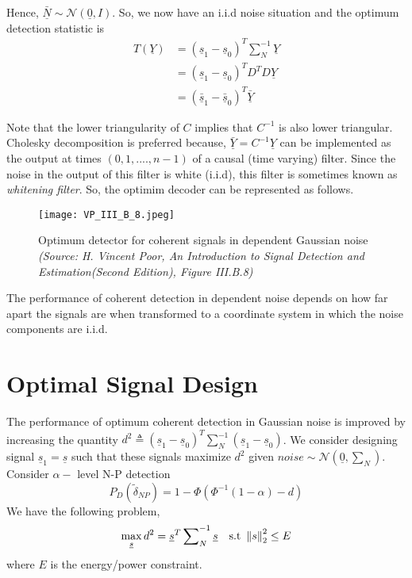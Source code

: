 \documentclass[a4paper,english,12pt]{article}
\begin{document}
\noindent Hence, $\underline{\bar{N}} \sim \mathcal{N}(\underline{0},I)$. So, we now have an i.i.d noise situation and the optimum detection statistic is 
\begin{align*}
T(\underline{Y}) &=(\underline{s}_1 - \underline{s}_0)^T\sum\nolimits_N^{-1}\underline{Y} \\
&=(\underline{s}_1 - \underline{s}_0)^T D^T D \underline{Y} \\
&=(\underline{\bar{s}}_1 - \underline{\bar{s}}_0)^T \underline{\bar{Y}}
\end{align*}

\noindent Note that the lower triangularity of $C$ implies that $C^{-1}$ is also lower triangular.\\
Cholesky decomposition is preferred because, $\underline{\bar{Y}}=C^{-1}\underline{Y}$ can be implemented as the output at times $(0,1,....,n-1)$ of a causal (time varying) filter. Since the noise in the output of this filter is white (i.i.d), this filter is sometimes known as \textit{whitening filter}. So, the optimim decoder can be represented as follows.  

\begin{figure}[hbtp]
\centering
\texttt{[image: VP\_III\_B\_8.jpeg]}
\caption{Optimum detector for coherent signals in dependent Gaussian noise \\ \textit{(Source: H. Vincent Poor, An Introduction to Signal Detection and Estimation(Second
Edition), Figure III.B.8)}}
\label{vp_III_B_8}
\end{figure}

\noindent The performance of coherent detection in dependent noise depends on how far apart the signals are when transformed to a coordinate system in which the noise components are i.i.d.

\section{Optimal Signal Design}
The performance of optimum coherent detection in Gaussian noise is improved by increasing the quantity $d^2 \triangleq (\underline{s}_1 - \underline{s}_0)^T \sum_N^{-1} (\underline{s}_1 - \underline{s}_0)$. We consider designing signal $\underline{s}_1=\underline{s}$ such that these signals maximize $d^2$ given $noise \sim \mathcal{N}(\underline{0},\sum_N)$.\\
Consider $\alpha-$ level N-P detection 
$$ P_D(\tilde{\delta}_{NP}) = 1-\Phi(\Phi^{-1}(1-\alpha) -d)$$
We have the following problem,
\begin{equation}
\max_{\underline{s}} d^2 = \underline{s}^T \sum\nolimits_N^{-1} \underline{s} \ \ \  \mbox{s.t} \ \left\lVert s\right\rVert^2_2 \leq E
\end{equation}
\noindent where $E$ is the energy/power constraint.\\
\end{document}
